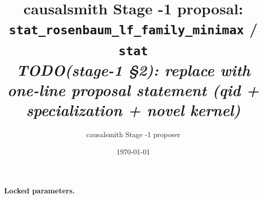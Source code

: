 \documentclass[11pt]{article}
\title{causalsmith Stage -1 proposal: \texttt{stat\_rosenbaum\_lf\_family\_minimax} / \texttt{stat}%
  \\ \large\textit{TODO(stage-1 \S2): replace with one-line proposal statement (qid + specialization + novel kernel)}}
\author{causalsmith Stage -1 proposer}
\date{\today}
\theoremstyle{definition}
\theoremstyle{plain}
\theoremstyle{remark}
\begin{document}
\maketitle


\paragraph{Locked parameters.}

\begin{abstract}
\end{abstract}
\end{document}
